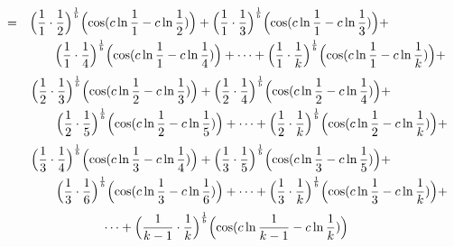 \documentclass{amsart}
\begin{document}
	\[
	\begin{aligned}
		= \quad & \Bigl( \frac{1}{1} \cdot \frac{1}{2} \Bigr)^\frac1b \Bigl( \cos(c \ln \frac{1}{1} - c \ln \frac{1}{2}) \Bigr) + \Bigl( \frac{1}{1} \cdot \frac{1}{3} \Bigr)^\frac1b \Bigl( \cos(c \ln \frac{1}{1} - c \ln \frac{1}{3}) \Bigr) + \\
		& \qquad \Bigl( \frac{1}{1} \cdot \frac{1}{4} \Bigr)^\frac1b \Bigl( \cos(c \ln \frac{1}{1} - c \ln \frac{1}{4}) \Bigr) + \dots  + \Bigl( \frac{1}{1} \cdot \frac{1}{k} \Bigr)^\frac1b \Bigl( \cos(c \ln \frac{1}{1} - c \ln \frac{1}{k}) \Bigr) + 
	\end{aligned}
	\]
	\[
	\begin{aligned}
		\quad\quad & \Bigl( \frac{1}{2} \cdot \frac{1}{3} \Bigr)^\frac1b \Bigl( \cos(c \ln \frac{1}{2} - c \ln \frac{1}{3}) \Bigr) + \Bigl( \frac{1}{2} \cdot \frac{1}{4} \Bigr)^\frac1b \Bigl( \cos(c \ln \frac{1}{2} - c \ln \frac{1}{4}) \Bigr) + \\
		& \qquad \Bigl( \frac{1}{2} \cdot \frac{1}{5} \Bigr)^\frac1b \Bigl( \cos(c \ln \frac{1}{2} - c \ln\frac{1}{5}) \Bigr) + \dots  + \Bigl( \frac{1}{2} \cdot \frac{1}{k} \Bigr)^\frac1b \Bigl( \cos(c \ln \frac{1}{2} - c \ln \frac{1}{k}) \Bigr) + 
	\end{aligned}
	\]
	\[
	\begin{aligned}
		\quad\quad & \Bigl( \frac{1}{3} \cdot \frac{1}{4} \Bigr)^\frac1b \Bigl( \cos(c \ln \frac{1}{3} - c \ln \frac{1}{4}) \Bigr) + \Bigl( \frac{1}{3} \cdot \frac{1}{5} \Bigr)^\frac1b \Bigl( \cos(c \ln \frac{1}{3} - c \ln \frac{1}{5}) \Bigr) + \\
		& \qquad \Bigl( \frac{1}{3} \cdot \frac{1}{6} \Bigr)^\frac1b \Bigl( \cos(c \ln \frac{1}{3} - c \ln \frac{1}{6}) \Bigr) + \dots  + \Bigl( \frac{1}{3} \cdot \frac{1}{k} \Bigr)^\frac1b \Bigl( \cos(c \ln \frac{1}{3} - c \ln \frac{1}{k}) \Bigr) + 
	\end{aligned}
	\]
	\[ \dots + \Bigl( \frac{1}{k-1} \cdot \frac{1}{k} \Bigr)^\frac1b \Bigl( \cos(c \ln \frac{1}{k-1} - c \ln \frac{1}{k}) \Bigr) \]
	\[\]
	
\end{document}
